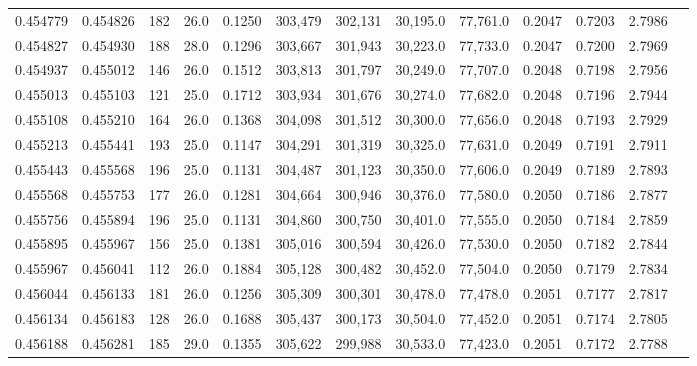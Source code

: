 \begin{tabular}{rrrrrrrrrrrrr}
0.454779 & 0.454826 &   182 & 26.0 &                                     0.1250 & 303,479 & 302,131 &  30,195.0 &  77,761.0 & 0.2047 & 0.7203 & 2.7986 \\
0.454827 & 0.454930 &   188 & 28.0 &                                     0.1296 & 303,667 & 301,943 &  30,223.0 &  77,733.0 & 0.2047 & 0.7200 & 2.7969 \\
0.454937 & 0.455012 &   146 & 26.0 &                                     0.1512 & 303,813 & 301,797 &  30,249.0 &  77,707.0 & 0.2048 & 0.7198 & 2.7956 \\
0.455013 & 0.455103 &   121 & 25.0 &                                     0.1712 & 303,934 & 301,676 &  30,274.0 &  77,682.0 & 0.2048 & 0.7196 & 2.7944 \\
0.455108 & 0.455210 &   164 & 26.0 &                                     0.1368 & 304,098 & 301,512 &  30,300.0 &  77,656.0 & 0.2048 & 0.7193 & 2.7929 \\
0.455213 & 0.455441 &   193 & 25.0 &                                     0.1147 & 304,291 & 301,319 &  30,325.0 &  77,631.0 & 0.2049 & 0.7191 & 2.7911 \\
0.455443 & 0.455568 &   196 & 25.0 &                                     0.1131 & 304,487 & 301,123 &  30,350.0 &  77,606.0 & 0.2049 & 0.7189 & 2.7893 \\
0.455568 & 0.455753 &   177 & 26.0 &                                     0.1281 & 304,664 & 300,946 &  30,376.0 &  77,580.0 & 0.2050 & 0.7186 & 2.7877 \\
0.455756 & 0.455894 &   196 & 25.0 &                                     0.1131 & 304,860 & 300,750 &  30,401.0 &  77,555.0 & 0.2050 & 0.7184 & 2.7859 \\
0.455895 & 0.455967 &   156 & 25.0 &                                     0.1381 & 305,016 & 300,594 &  30,426.0 &  77,530.0 & 0.2050 & 0.7182 & 2.7844 \\
0.455967 & 0.456041 &   112 & 26.0 &                                     0.1884 & 305,128 & 300,482 &  30,452.0 &  77,504.0 & 0.2050 & 0.7179 & 2.7834 \\
0.456044 & 0.456133 &   181 & 26.0 &                                     0.1256 & 305,309 & 300,301 &  30,478.0 &  77,478.0 & 0.2051 & 0.7177 & 2.7817 \\
0.456134 & 0.456183 &   128 & 26.0 &                                     0.1688 & 305,437 & 300,173 &  30,504.0 &  77,452.0 & 0.2051 & 0.7174 & 2.7805 \\
0.456188 & 0.456281 &   185 & 29.0 &                                     0.1355 & 305,622 & 299,988 &  30,533.0 &  77,423.0 & 0.2051 & 0.7172 & 2.7788 \\

\end{tabular}
